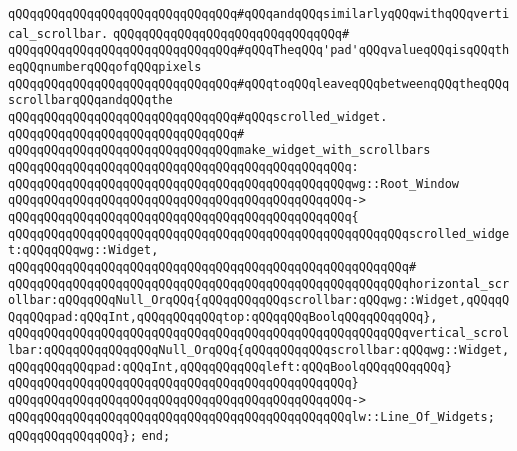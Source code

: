 \verb|qQQqqQQqqQQqqQQqqQQqqQQqqQQqqQQq#qQQqandqQQqsimilarlyqQQqwithqQQqvertical_scrollbar.|\newline
\verb|qQQqqQQqqQQqqQQqqQQqqQQqqQQqqQQq#|\newline
\verb|qQQqqQQqqQQqqQQqqQQqqQQqqQQqqQQq#qQQqTheqQQq'pad'qQQqvalueqQQqisqQQqtheqQQqnumberqQQqofqQQqpixels|\newline
\verb|qQQqqQQqqQQqqQQqqQQqqQQqqQQqqQQq#qQQqtoqQQqleaveqQQqbetweenqQQqtheqQQqscrollbarqQQqandqQQqthe|\newline
\verb|qQQqqQQqqQQqqQQqqQQqqQQqqQQqqQQq#qQQqscrolled_widget.|\newline
\verb|qQQqqQQqqQQqqQQqqQQqqQQqqQQqqQQq#|\newline
\verb|qQQqqQQqqQQqqQQqqQQqqQQqqQQqqQQqmake_widget_with_scrollbars|\newline
\verb|qQQqqQQqqQQqqQQqqQQqqQQqqQQqqQQqqQQqqQQqqQQqqQQq:|\newline
\verb|qQQqqQQqqQQqqQQqqQQqqQQqqQQqqQQqqQQqqQQqqQQqqQQqwg::Root_Window|\newline
\verb|qQQqqQQqqQQqqQQqqQQqqQQqqQQqqQQqqQQqqQQqqQQqqQQq->|\newline
\verb|qQQqqQQqqQQqqQQqqQQqqQQqqQQqqQQqqQQqqQQqqQQqqQQq{|\newline
\verb|qQQqqQQqqQQqqQQqqQQqqQQqqQQqqQQqqQQqqQQqqQQqqQQqqQQqqQQqscrolled_widget:qQQqqQQqwg::Widget,|\newline
\verb|qQQqqQQqqQQqqQQqqQQqqQQqqQQqqQQqqQQqqQQqqQQqqQQqqQQqqQQq#|\newline
\verb|qQQqqQQqqQQqqQQqqQQqqQQqqQQqqQQqqQQqqQQqqQQqqQQqqQQqqQQqhorizontal_scrollbar:qQQqqQQqNull_OrqQQq{qQQqqQQqqQQqscrollbar:qQQqwg::Widget,qQQqqQQqqQQqpad:qQQqInt,qQQqqQQqqQQqtop:qQQqqQQqBoolqQQqqQQqqQQq},|\newline
\verb|qQQqqQQqqQQqqQQqqQQqqQQqqQQqqQQqqQQqqQQqqQQqqQQqqQQqqQQqvertical_scrollbar:qQQqqQQqqQQqqQQqNull_OrqQQq{qQQqqQQqqQQqscrollbar:qQQqwg::Widget,qQQqqQQqqQQqpad:qQQqInt,qQQqqQQqqQQqleft:qQQqBoolqQQqqQQqqQQq}|\newline
\verb|qQQqqQQqqQQqqQQqqQQqqQQqqQQqqQQqqQQqqQQqqQQqqQQq}|\newline
\verb|qQQqqQQqqQQqqQQqqQQqqQQqqQQqqQQqqQQqqQQqqQQqqQQq->|\newline
\verb|qQQqqQQqqQQqqQQqqQQqqQQqqQQqqQQqqQQqqQQqqQQqqQQqlw::Line_Of_Widgets;|\newline
\verb|qQQqqQQqqQQqqQQq};|\newline
\newline
\verb|end;|\newline
\newline

